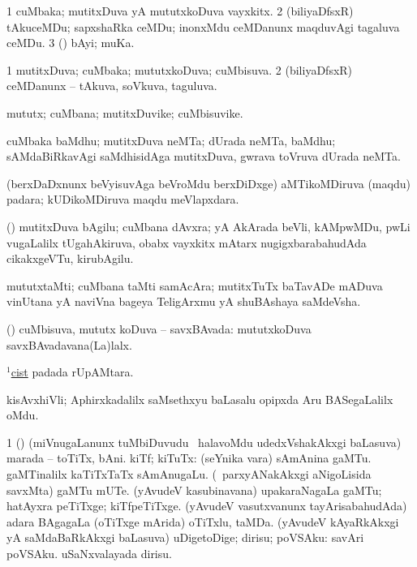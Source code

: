 \bentry
{}
\gl{\nA}
\bmng
\bnum
\num{1} cuMbaka; mutitxDuva yA mututxkoDuva vayxkitx. 
\num{2} (biliyaDfsxR) tAkuceMDu; sapxshaRka ceMDu; inonxMdu ceMDanunx maqduvAgi tagaluva ceMDu. 
\num{3} (\ashi) bAyi; muKa. 
\enum
\emng
\eentry

\bentry
{}
\gl{\gu}
\bmng
\bnum
\num{1} mutitxDuva; cuMbaka; mututxkoDuva; cuMbisuva. 
\num{2} (biliyaDfsxR) ceMDanunx -- tAkuva, soVkuva, taguluva. 
\enum
\emng
\eentry

\bentry
{}
\gl{\nA}
\bmng
mututx; cuMbana; mutitxDuvike; cuMbisuvike. 
\emng
\eentry

\bentry
{}
\gl{\nA}
\bmng
cuMbaka baMdhu; mutitxDuva neMTa; dUrada neMTa, baMdhu; sAMdaBiRkavAgi saMdhisidAga mutitxDuva, gwrava toVruva dUrada neMTa. 
\emng
\eentry

\bentry
{}
\gl{\nA}
\bmng
(berxDaDxnunx beVyisuvAga beVroMdu berxDiDxge) aMTikoMDiruva (maqdu) padara; kUDikoMDiruva maqdu meVlapxdara. 
\emng
\eentry

\bentry
{}
\gl{\nA}
\bmng
(\birx) mutitxDuva bAgilu; cuMbana dAvxra;  yA  AkArada beVli, kAMpwMDu, pwLi \mo vugaLalilx tUgahAkiruva, obabx vayxkitx mAtarx nugigxbarabahudAda cikakxgeVTu, kirubAgilu. 
\emng
\eentry

\bentry
{}
\gl{\nA}
\bmng
mututxtaMti; cuMbana taMti samAcAra; mutitxTuTx baTavADe mADuva vinUtana yA naviVna bageya TeligArxmu yA shuBAshaya saMdeVsha. 
\emng
\eentry

\bentry
{}
\gl{\gu}
\bmng
(\AmA) cuMbisuva, mututx koDuva -- savxBAvada:  mututxkoDuva savxBAvadavana(La)lalx. 
\emng
\eentry

\bentry
{}
\gl{\nA}
\bmng
\hyperref{kandict_c.pdf}{C}{cist(1)}{$^1$cist} padada rUpAMtara. 
\emng
\eentry

\bentry
{}
\gl{\nA}
\bmng
kisAvxhiVli; Aphirxkadalilx  saMsethxyu baLasalu opipxda Aru BASegaLalilx oMdu. 
\emng
\eentry

\bentry
{}
\gl{\nA}
\bmng
\bnum
\num{1} (\birx) (miVnugaLanunx tuMbiDuvudu \mo\ halavoMdu udedxVshakAkxgi baLasuva) marada -- toTiTx, bAni. 
 kiTf; kiTuTx: 
\banum
{} (seYnika \mo vara) sAmAnina gaMTu. 
 gaMTinalilx kaTiTxTaTx sAmAnugaLu. 
 (\kanmu\ parxyANakAkxgi aNigoLisida savxMta) gaMTu mUTe. 
 (yAvudeV kasubinavana) upakaraNagaLa gaMTu; hatAyxra peTiTxge; kiTfpeTiTxge. 
 (yAvudeV vasutxvanunx tayArisabahudAda) adara BAgagaLa (oTiTxge mArida) oTiTxlu, taMDa. 
 (yAvudeV kAyaRkAkxgi yA saMdaBaRkAkxgi baLasuva) uDigetoDige; dirisu; poVSAku:  savAri poVSAku.  uSaNxvalayada dirisu. 
\eanum
\numie
\enum
\emng
\eentry


